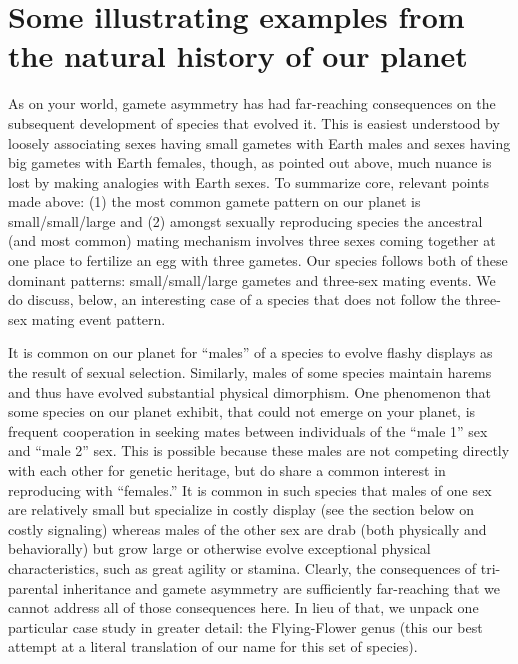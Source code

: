 \documentclass{report}
\begin{document}
\section*{Some illustrating examples from the natural history of our planet}
As on your world, gamete asymmetry has had far-reaching consequences on the subsequent development of species that evolved it. This is easiest understood by loosely associating sexes having small gametes with Earth males and sexes having big gametes with Earth females, though, as pointed out above, much nuance is lost by making analogies with Earth sexes. To summarize core, relevant points made above: (1) the most common gamete pattern on our planet is small/small/large and (2) amongst sexually reproducing species the ancestral (and most common) mating mechanism involves three sexes coming together at one place to fertilize an egg with three gametes. Our species follows both of these dominant patterns: small/small/large gametes and three-sex mating events. We do discuss, below, an interesting case of a species that does not follow the three-sex mating event pattern.

It is common on our planet for ``males'' of a species to evolve flashy displays as the result of sexual selection. Similarly, males of some species maintain harems and thus have evolved substantial physical dimorphism. One phenomenon that some species on our planet exhibit, that could not emerge on your planet, is frequent cooperation in seeking mates between individuals of the ``male 1'' sex and ``male 2'' sex. This is possible because these males are not competing directly with each other for genetic heritage, but do share a common interest in reproducing with ``females.'' It is common in such species that males of one sex are relatively small but specialize in costly display (see the section below on costly signaling) whereas males of the other sex are drab (both physically and behaviorally) but grow large or otherwise evolve exceptional physical characteristics, such as great agility or stamina. Clearly, the consequences of tri-parental inheritance and gamete asymmetry are sufficiently far-reaching that we cannot address all of those consequences here. In lieu of that, we unpack one particular case study in greater detail: the Flying-Flower genus (this our best attempt at a literal translation of our name for this set of species).
\end{document}
